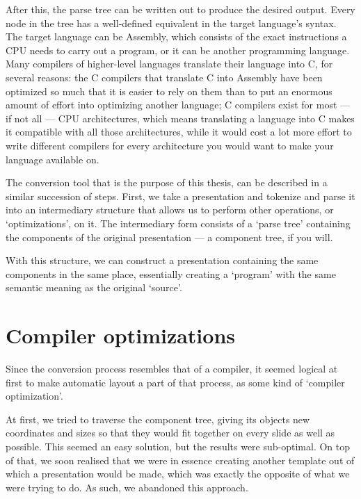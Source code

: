    After this, the parse tree can be written out to produce the desired output.
   Every node in the tree has a well-defined equivalent in the target
   language's syntax. The target language can be Assembly, which consists of
   the exact instructions a CPU needs to carry out a program, or it can be
   another programming language. Many compilers of higher-level languages
   translate their language into C, for several reasons: the C compilers that
   translate C into Assembly have been optimized so much that it is easier to
   rely on them than to put an enormous amount of effort into optimizing
   another language; C compilers exist for most --- if not all --- CPU
   architectures, which means translating a language into C makes it compatible
   with all those architectures, while it would cost a lot more effort to write
   different compilers for every architecture you would want to make your
   language available on.

   The conversion tool that is the purpose of this thesis, can be described in
   a similar succession of steps. First, we take a \ppt presentation and
   tokenize and parse it into an intermediary structure that allows us to
   perform other operations, or `optimizations', on it. The intermediary form
   consists of a `parse tree' containing the components of the original
   presentation --- a component tree, if you will.

   With this structure, we can construct a \mxp presentation containing the
   same components in the same place, essentially creating a `program' with the
   same semantic meaning as the original `source'.

  \section{Compiler optimizations}

   Since the conversion process resembles that of a compiler, it seemed logical
   at first to make automatic layout a part of that process, as some kind of
   `compiler optimization'.

   At first, we tried to traverse the component tree, giving its objects new
   coordinates and sizes so that they would fit together on every slide as well
   as possible. This seemed an easy solution, but the results were sub-optimal.
   On top of that, we soon realised that we were in essence creating another
   template out of which a presentation would be made, which was exactly the
   opposite of what we were trying to do. As such, we abandoned this approach.

